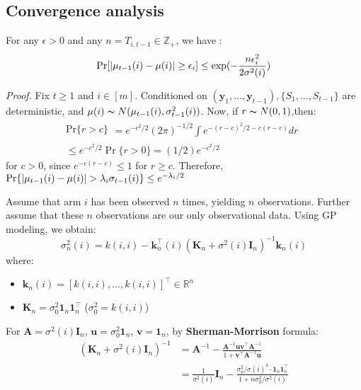 \documentclass[opre,sglanonrev]{informs4}
\begin{document}
\subsection{Convergence analysis}
\begin{lemma}
For any $\epsilon > 0$ and any $n = T_{i,t-1} \in \mathbb{Z}_+$, we have :
$$
\textnormal{Pr}[|\mu_{t-1}(i)-\mu(i)|\geq \epsilon_i]\leq \exp(-\frac{n\epsilon_i^2}{2\sigma^2(i)})
$$
\end{lemma} 
\textit{Proof.} Fix $t\geq 1$ and $i\in [m]$. Conditioned on $(\mathbf{y}_1,...,\mathbf{y}_{t-1}), \{S_1,...,S_{t-1}\}$ are deterministic, and $\mu(i)\thicksim N(\mu_{t-1}(i),\sigma_{t-1}^2(i))$. Now, if $r\thicksim N(0,1)$,then: 
$$\begin{gathered}
\mathrm{Pr}\{r>c\}
\begin{aligned}
=e^{-c^2/2}(2\pi)^{-1/2}\int e^{-(r-c)^2/2-c(r-c)}dr
\end{aligned} \\
\leq e^{-c^2/2}\Pr\{r>0\}=(1/2)e^{-c^2/2}
\end{gathered}$$
for $c>0$, since $e^{-c(r-c)}\leq 1$ for $r\geq c$. Therefore, $\textnormal{Pr}\{|\mu_{t-1}(i)-\mu(i)|>\lambda_i \sigma_{t-1}(i)\}\leq e^{-\lambda_i/2}$

Assume that arm $i$ has been observed $n$ times, yielding $n$ observations. Further assume that these $n$ observations are our only observational data. Using GP modeling, we obtain:
\[
\sigma_n^2(i) = k(i,i) - \mathbf{k}_n^\top(i)(\mathbf{K}_n + \sigma^2(i)\mathbf{I}_n)^{-1}\mathbf{k}_n(i)
\]
where:
\begin{itemize}
    \item $\mathbf{k}_n(i) = [k(i,i),\dots,k(i,i)]^\top \in \mathbb{R}^n$
    \item $\mathbf{K}_n = \sigma_0^2\mathbf{1}_n\mathbf{1}_n^\top$ ($\sigma_0^2 = k(i,i)$)
\end{itemize} %

For $\mathbf{A} = \sigma^2(i)\mathbf{I}_n$, $\mathbf{u} = \sigma_0^2\mathbf{1}_n$, $\mathbf{v} = \mathbf{1}_n$, by \textbf{Sherman-Morrison} formula:
\begin{equation*}
\begin{aligned}
(\mathbf{K}_n + \sigma^2(i)\mathbf{I}_n)^{-1} &= \mathbf{A}^{-1} - \frac{\mathbf{A}^{-1}\mathbf{u}\mathbf{v}^\top\mathbf{A}^{-1}}{1 + \mathbf{v}^\top\mathbf{A}^{-1}\mathbf{u}} \\
&= \frac{1}{\sigma^2(i)}\mathbf{I}_n - \frac{\sigma_0^2/\sigma(i)^4 \cdot \mathbf{1}_n\mathbf{1}_n^\top}{1 + n\sigma_0^2/\sigma^2(i)}
\end{aligned}
\end{equation*} 
\end{document}
